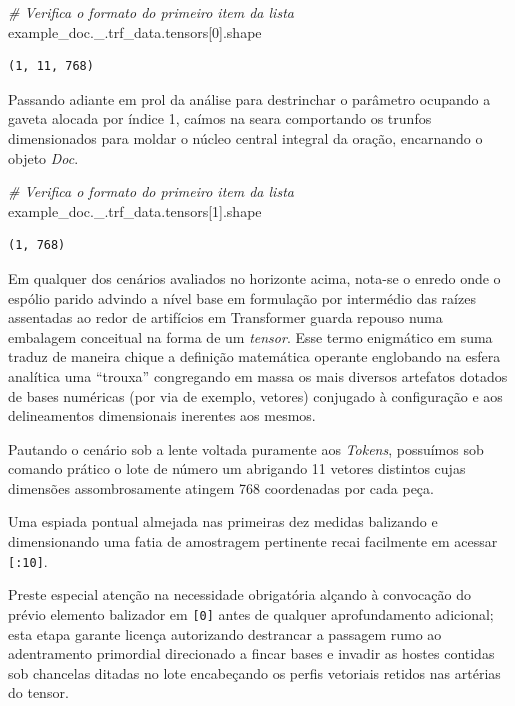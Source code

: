\documentclass[
  brazilian,
]{article}
\newenvironment{Shaded}{}{}
\newcommand{\CommentTok}[1]{\textcolor[rgb]{0.38,0.63,0.69}{\textit{#1}}}
\newcommand{\DecValTok}[1]{\textcolor[rgb]{0.25,0.63,0.44}{#1}}
\newcommand{\NormalTok}[1]{#1}
\begin{document}
\begin{Shaded}
\begin{Highlighting}[]
\CommentTok{\# Verifica o formato do primeiro item da lista}
\NormalTok{example\_doc.\_.trf\_data.tensors[}\DecValTok{0}\NormalTok{].shape}
\end{Highlighting}
\end{Shaded}

\begin{verbatim}
(1, 11, 768)
\end{verbatim}

Passando adiante em prol da análise para destrinchar o parâmetro
ocupando a gaveta alocada por índice 1, caímos na seara comportando os
trunfos dimensionados para moldar o núcleo central integral da oração,
encarnando o objeto \emph{Doc}.

\begin{Shaded}
\begin{Highlighting}[]
\CommentTok{\# Verifica o formato do primeiro item da lista}
\NormalTok{example\_doc.\_.trf\_data.tensors[}\DecValTok{1}\NormalTok{].shape}
\end{Highlighting}
\end{Shaded}

\begin{verbatim}
(1, 768)
\end{verbatim}

Em qualquer dos cenários avaliados no horizonte acima, nota-se o enredo
onde o espólio parido advindo a nível base em formulação por intermédio
das raízes assentadas ao redor de artifícios em Transformer guarda
repouso numa embalagem conceitual na forma de um \emph{tensor}. Esse
termo enigmático em suma traduz de maneira chique a definição matemática
operante englobando na esfera analítica uma ``trouxa'' congregando em
massa os mais diversos artefatos dotados de bases numéricas (por via de
exemplo, vetores) conjugado à configuração e aos delineamentos
dimensionais inerentes aos mesmos.

Pautando o cenário sob a lente voltada puramente aos \emph{Tokens},
possuímos sob comando prático o lote de número um abrigando 11 vetores
distintos cujas dimensões assombrosamente atingem 768 coordenadas por
cada peça.

Uma espiada pontual almejada nas primeiras dez medidas balizando e
dimensionando uma fatia de amostragem pertinente recai facilmente em
acessar \texttt{{[}:10{]}}.

Preste especial atenção na necessidade obrigatória alçando à convocação
do prévio elemento balizador em \texttt{{[}0{]}} antes de qualquer
aprofundamento adicional; esta etapa garante licença autorizando
destrancar a passagem rumo ao adentramento primordial direcionado a
fincar bases e invadir as hostes contidas sob chancelas ditadas no lote
encabeçando os perfis vetoriais retidos nas artérias do tensor.
\end{document}
